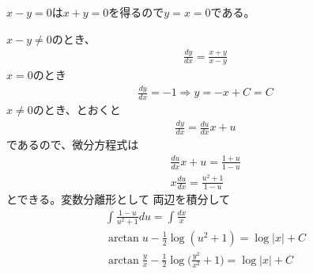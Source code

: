 \begin{ans*}
  $x-y = 0$は$x+y=0$を得るので$y = x = 0$である。

  $x-y\neq 0$のとき、
  \begin{gather}
    \frac{dy}{dx} = \frac{x+y}{x-y}
  \end{gather}
  $x=0$のとき
    \begin{gather}
      \frac{dy}{dx} = -1\Rightarrow y = -x + C = C
    \end{gather}
  $x\neq 0$のとき、とおくと
  \begin{gather}
    \frac{dy}{dx} = \frac{du}{dx}x + u
  \end{gather}
  であるので、微分方程式は
  \begin{gather}
    \frac{du}{dx}x + u = \frac{1 + u}{1 - u} \\
    x\frac{du}{dx} = \frac{u^2 + 1}{1-u}
  \end{gather}
  とできる。変数分離形として
  両辺を積分して
  \begin{gather}
    \int\frac{1-u}{u^2+1}du = \int\frac{dx}{x} \\
    \arctan u - \frac{1}{2}\log(u^2+1) = \log |x| + C \\
    \arctan \frac{y}{x} - \frac{1}{2}\log\biggl(\frac{y^2}{x^2}+1\biggr) = \log |x| + C
  \end{gather}
\end{ans*}


